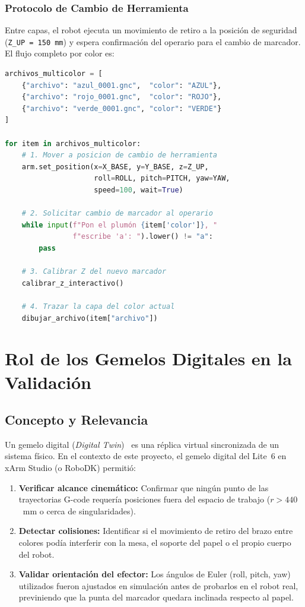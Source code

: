 \documentclass[journal,compsoc]{IEEEtran}
\begin{document}
\subsubsection{Protocolo de Cambio de Herramienta}

Entre capas, el robot ejecuta un movimiento de retiro a la posición de seguridad (\texttt{Z\_UP = 150~mm}) y espera confirmación del operario para el cambio de marcador. El flujo completo por color es:

\begin{lstlisting}[language=Python, caption=Bucle principal de trazado multicolor.]
archivos_multicolor = [
    {"archivo": "azul_0001.gnc",  "color": "AZUL"},
    {"archivo": "rojo_0001.gnc",  "color": "ROJO"},
    {"archivo": "verde_0001.gnc", "color": "VERDE"}
]

for item in archivos_multicolor:
    # 1. Mover a posicion de cambio de herramienta
    arm.set_position(x=X_BASE, y=Y_BASE, z=Z_UP,
                     roll=ROLL, pitch=PITCH, yaw=YAW,
                     speed=100, wait=True)

    # 2. Solicitar cambio de marcador al operario
    while input(f"Pon el plumón {item['color']}, "
                f"escribe 'a': ").lower() != "a":
        pass

    # 3. Calibrar Z del nuevo marcador
    calibrar_z_interactivo()

    # 4. Trazar la capa del color actual
    dibujar_archivo(item["archivo"])
\end{lstlisting}

\section{Rol de los Gemelos Digitales en la Validación}

\subsection{Concepto y Relevancia}

Un gemelo digital (\textit{Digital Twin})~\cite{grieves_dt} es una réplica virtual sincronizada de un sistema físico. En el contexto de este proyecto, el gemelo digital del Lite~6 en xArm Studio (o RoboDK) permitió:

\begin{enumerate}
    \item \textbf{Verificar alcance cinemático:} Confirmar que ningún punto de las trayectorias G-code requería posiciones fuera del espacio de trabajo ($r > 440$~mm o cerca de singularidades).
    \item \textbf{Detectar colisiones:} Identificar si el movimiento de retiro del brazo entre colores podía interferir con la mesa, el soporte del papel o el propio cuerpo del robot.
    \item \textbf{Validar orientación del efector:} Los ángulos de Euler (roll, pitch, yaw) utilizados fueron ajustados en simulación antes de probarlos en el robot real, previniendo que la punta del marcador quedara inclinada respecto al papel.
\end{enumerate}
\end{document}
